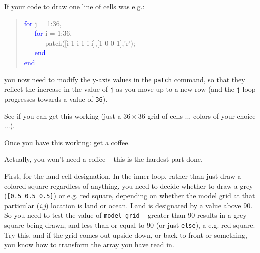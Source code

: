 \documentclass{tufte-book} %
\newenvironment{docspec}{\begin{quotation}\ttfamily\parskip0pt\parindent0pt\ignorespaces}{\end{quotation}}
\begin{document}
If your code to draw one line of cells was e.g.:
\begin{docspec}
\textcolor{blue}{for} j = 1:36,\\
\ \ \ \textcolor{blue}{for} i = 1:36,\\
\ \ \ \ \ \ patch([i-1 i-1 i i],[1 0 0 1],'r');\\
\ \ \ \textcolor{blue}{end}\\
\textcolor{blue}{end}
\end{docspec}
you now need to modify the y-axis values in the \texttt{patch} command, so that they reflect the increase in the value of \texttt{j} as you move up to a new row (and the \texttt{j} loop progresses towards a value of \texttt{36}).

See if you can get this working (just a \(36\times36\) grid of cells ... colors of your choice ...).

Once you have this working: get a coffee.

Actually, you won't need a coffee -- this is the hardest part done.

First, for the land cell designation. In the inner loop, rather than just draw a colored square regardless of anything, you need to decide whether to draw a grey (\texttt{[0.5 0.5 0.5]}) or e.g. red square, depending on whether the model grid at that particular (\textit{i,j}) location is land or ocean. Land is designated by a value above 90. So you need to test the value of \texttt{model\_grid} -- greater than 90 results in a grey square being drawn, and less than or equal to 90 (or just \texttt{else}), a e.g. red square. Try this, and if the grid comes out upside down, or back-to-front or something, you know how to transform the array you have read in.
\end{document}
